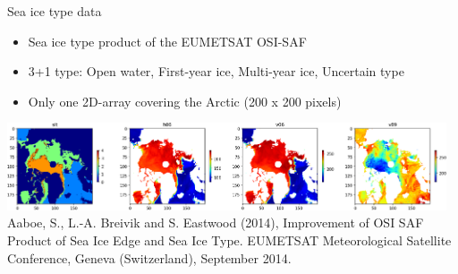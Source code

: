\documentclass[handout, 10pt]{beamer}
\begin{document}
\begin{frame}{Sea ice type data}
\begin{itemize}
    \item Sea ice type product of the EUMETSAT OSI-SAF
    \item 3+1 type: Open water, First-year ice, Multi-year ice, Uncertain type
    \item Only one 2D-array covering the Arctic (\alert{200 x 200} pixels)
\end{itemize}
\pause
\hspace*{-1cm}\includegraphics[width=13cm]{sit_amsr2_bands}
\tiny Aaboe, S., L.-A. Breivik and S. Eastwood (2014), Improvement of OSI SAF Product of Sea Ice Edge and Sea Ice Type. EUMETSAT Meteorological Satellite Conference, Geneva (Switzerland), September 2014.
\end{frame}
\end{document}

